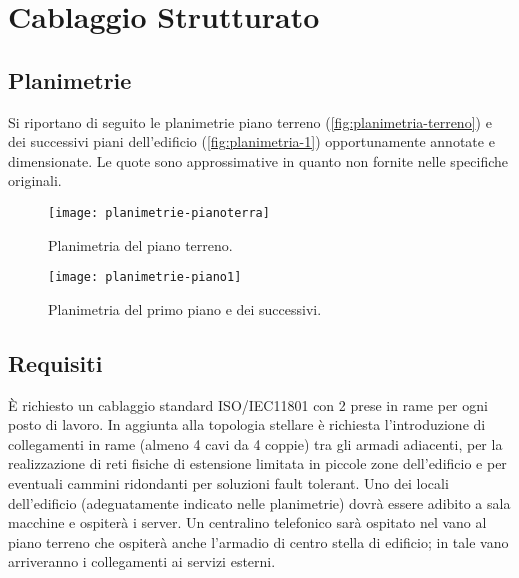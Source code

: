 %

\chapter{Cablaggio Strutturato}


\section{Planimetrie}
Si riportano di seguito le planimetrie piano terreno (\autoref{fig:planimetria-terreno}) e dei successivi piani
dell'edificio (\autoref{fig:planimetria-1}) opportunamente annotate e dimensionate.
Le quote sono approssimative in quanto non fornite nelle specifiche originali.

\begin{figure}[ht]
    \texttt{[image: planimetrie-pianoterra]}
    \caption{Planimetria del piano terreno.}
    \label{fig:planimetria-terreno}
\end{figure}

\begin{figure}[ht]
    \texttt{[image: planimetrie-piano1]}
    \caption{Planimetria del primo piano e dei successivi.}
    \label{fig:planimetria-1}
\end{figure}

\newpage
\section{Requisiti}
È richiesto un cablaggio standard ISO/IEC11801 con \num{2} prese in rame per ogni posto di lavoro.
In aggiunta alla topologia stellare è richiesta l’introduzione di collegamenti in rame (almeno \num{4} cavi da \num{4} coppie)
tra gli armadi adiacenti, per la realizzazione di reti fisiche di estensione limitata in piccole zone dell’edificio
e per eventuali cammini ridondanti per soluzioni fault tolerant.
Uno dei locali dell’edificio (adeguatamente indicato nelle planimetrie) dovrà essere adibito a sala macchine e
ospiterà i server.
Un centralino telefonico sarà ospitato nel vano al piano terreno che ospiterà anche l’armadio di centro stella di
edificio; in tale vano arriveranno i collegamenti ai servizi esterni.
